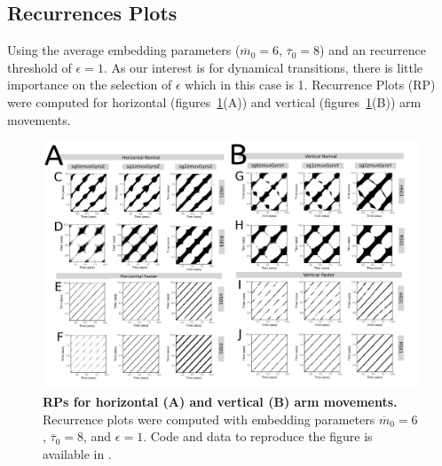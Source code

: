 \documentclass[fleqn,10pt]{wlscirep}
\begin{document}
\subsection*{Recurrences Plots}
Using the average embedding parameters 
($\overline{m}_0=6$, $\overline{\tau}_0=8$) 
and an recurrence threshold of $\epsilon=1$.
As our interest is for dynamical transitions, 
there is little importance on the selection of $\epsilon$ which in this case
is 1. 
Recurrence Plots (RP) were computed for horizontal (figures~\ref{fig:rpsr}(A)) and 
vertical (figures~\ref{fig:rpsr}(B)) arm movements.
\begin{figure}[ht]
\centering
\includegraphics[width=1.0\textwidth]{figures/rps/versions/drawing-v00.pdf}
\caption{
	{\bf RPs for horizontal (A) and vertical (B) arm movements.}	
	Recurrence plots were computed with 
	embedding parameters 
	$\overline{m}_0=6$, $\overline{\tau}_0=8$, and $\epsilon=1$.
	Code and data to reproduce the figure is available in \cite{srep2020}.
        }
    \label{fig:rpsr}
\end{figure}
\end{document}
